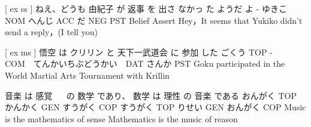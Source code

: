 [ ex ss ]
ねえ、どうも 由紀子 が  返事   を  出さ なかっ た ようだ  よ
-           ゆきこ NOM へんじ ACC  だ   NEG  PST Belief Assert
Hey，It seems that Yukiko didn't send a reply，(I tell you)

[ ex ms ]
悟空   は  クリリン と    天下一武道会         に   参加 した
ごくう TOP -　　　　COM　てんかいちぶどうかい　DAT さんか PST
Goku participated in the World Martial Arts Tournament with Krillin

音楽    は   感覚 　 の   数学  であり、 数学    は  理性   の  音楽  である
おんがく TOP かんかく GEN すうがく COP すうがく TOP りせい GEN おんがく COP
Music is the mathematics of sense
Mathematics is the music of reason
